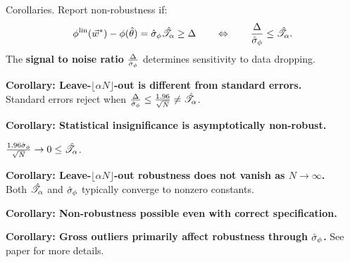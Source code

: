 \begin{frame}[t]{Corollaries.}
%
Report non-robustness if:
%
\begin{align*}
%
\thetafunlin(\w^*) - \thetafun(\thetahat)  = \noise \shape \ge \Delta
\quad\quad
\Leftrightarrow
\quad\quad
\frac{\Delta}{\noise} \le \shape.
%
\end{align*}
%
The \textbf{signal to noise ratio} $\frac{\Delta}{\hat\sigma_{\phi}}$
determines sensitivity to data dropping.


\hrulefill


\pause
\vspace{0.5em}
\textbf{Corollary:  Leave-$\lfloor \alpha N \rfloor$-out is different from standard errors.}\\
Standard errors reject when
$\frac{\Delta}{\hat\sigma_{\phi}} \le \frac{1.96}{\sqrt{N}} \ne \hat{\mathscr{T}}_\alpha$.

\pause
\vspace{0.5em}
\textbf{Corollary:  Statistical insignificance is asymptotically non-robust.}

$\frac{1.96 \hat \sigma_\phi}{\sqrt{N}} \rightarrow 0 \le \hat{\mathscr{T}}_\alpha$.

\pause
\vspace{0.5em}
\textbf{Corollary:  Leave-$\lfloor \alpha N \rfloor$-out robustness does not vanish as $N \rightarrow \infty$.}\\
%
Both $\hat{\mathscr{T}}_\alpha$ and $\hat\sigma_{\phi}$ typically converge to nonzero constants.

\pause
\vspace{0.5em}
\textbf{Corollary:  Non-robustness possible even with correct specification.}

\pause
\vspace{0.5em}
\textbf{Corollary:  Gross outliers primarily affect robustness
through $\hat\sigma_{\phi}$.}
See paper for more details.

\end{frame}
